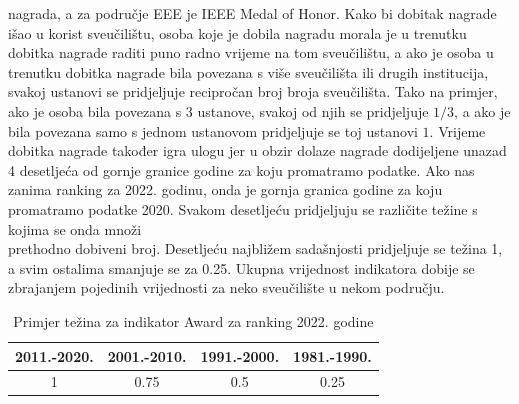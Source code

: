 \documentclass[times, utf8, zavrsni]{fer}
\begin{document}
nagrada, a za područje EEE je IEEE Medal of Honor.
Kako bi dobitak nagrade išao u korist sveučilištu, osoba koje je dobila nagradu morala je u trenutku dobitka nagrade raditi puno radno vrijeme na 
tom sveučilištu, a ako  je osoba u trenutku dobitka nagrade bila povezana s više sveučilišta ili drugih institucija, svakoj ustanovi se pridjeljuje
recipročan broj broja sveučilišta. Tako na primjer, ako je osoba bila povezana s 3 ustanove, svakoj od njih se pridjeljuje $1/3$, a ako je bila 
povezana samo s jednom ustanovom pridjeljuje se toj ustanovi $1$. 
Vrijeme dobitka nagrade također igra ulogu jer u obzir dolaze nagrade dodijeljene unazad 4 desetljeća od gornje granice godine za koju promatramo podatke.
Ako nas zanima ranking za 2022. godinu, onda je gornja granica godine za koju promatramo podatke 2020. Svakom desetljeću pridjeljuju se različite težine 
s kojima se onda množi \\prethodno dobiveni broj. Desetljeću najbližem sadašnjosti pridjeljuje se težina 1, a svim ostalima smanjuje se za 0.25.
Ukupna vrijednost indikatora dobije se zbrajanjem pojedinih vrijednosti za neko sveučilište u nekom području.

\begin{table}[htb]
    \caption{Primjer težina za indikator Award za ranking 2022. godine}
        \label{tbl:konstante2}
        \centering
        \begin{tabular}{cccc} \hline
        2011.-2020. & 2001.-2010. & 1991.-2000. & 1981.-1990.\\ \hline
        1&0.75&0.5&0.25\\
        \end{tabular}
        \end{table}    
        \FloatBarrier
\newpage
\end{document}
